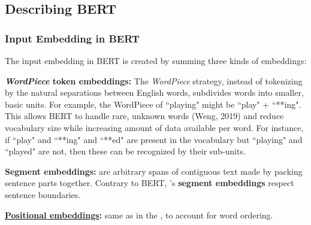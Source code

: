 





\subsection{Describing BERT} \label{sec:DescribingBERT}

\subsubsection{Input Embedding in BERT} \label{sec:BERTInputEmbedding}

The input embedding in BERT is created by summing three kinds of embeddings: 

\begin{enumerateSpaced}{3pt}
    \vspace{-10pt}
    \item \textbf{\textit{WordPiece} token embeddings: }The \emph{WordPiece}  strategy, instead of tokenizing by the natural separations between English words, subdivides words into smaller, basic units. For example, the WordPiece  of ``playing" might be ``play" + ``**ing". This allows BERT to handle rare, unknown words (Weng, 2019) and reduce vocabulary size while increasing amount of data available per word. For instance, if ``play" and ``**ing" and ``**ed" are present in the vocabulary but ``playing" and ``played" are not, then these can be recognized by their sub-units. 
    
    \item \textbf{Segment embeddings: }are  arbitrary spans of contiguous text made by packing sentence parts together. Contrary to BERT,  's \textbf{segment embeddings} respect sentence boundaries. 
    
    \item \textbf{\hyperref[sec:PosEncodings]{Positional embeddings}: } same as in the , to account for word ordering. 
\end{enumerateSpaced}


